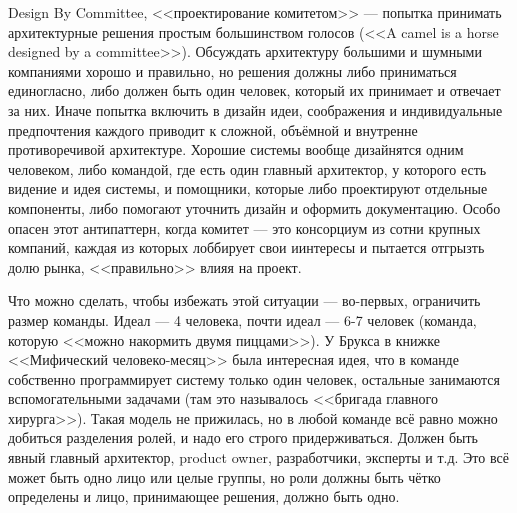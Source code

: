 \documentclass{../../text-style}
\begin{document}
Design By Committee, <<проектирование комитетом>> --- попытка принимать архитектурные решения простым большинством голосов (<<A camel is a horse designed by a committee>>). Обсуждать архитектуру большими и шумными компаниями хорошо и правильно, но решения должны либо приниматься единогласно, либо должен быть один человек, который их принимает и отвечает за них. Иначе попытка включить в дизайн идеи, соображения и индивидуальные предпочтения каждого приводит к сложной, объёмной и внутренне противоречивой архитектуре. Хорошие системы вообще дизайнятся одним человеком, либо командой, где есть один главный архитектор, у которого есть видение и идея системы, и помощники, которые либо проектируют отдельные компоненты, либо помогают уточнить дизайн и оформить документацию. Особо опасен этот антипаттерн, когда комитет --- это консорциум из сотни крупных компаний, каждая из которых лоббирует свои иинтересы и пытается отгрызть долю рынка, <<правильно>> влияя на проект.

Что можно сделать, чтобы избежать этой ситуации --- во-первых, ограничить размер команды. Идеал --- 4 человека, почти идеал --- 6-7 человек (команда, которую <<можно накормить двумя пиццами>>). У Брукса в книжке <<Мифический человеко-месяц>> была интересная идея, что в команде собственно программирует систему только один человек, остальные занимаются вспомогательными задачами (там это называлось <<бригада главного хирурга>>). Такая модель не прижилась, но в любой команде всё равно можно добиться разделения ролей, и надо его строго придерживаться. Должен быть явный главный архитектор, product owner, разработчики, эксперты и т.д. Это всё может быть одно лицо или целые группы, но роли должны быть чётко определены и лицо, принимающее решения, должно быть одно.
\end{document}
